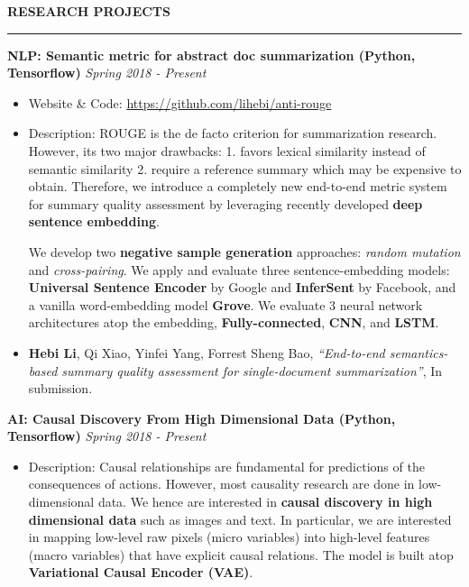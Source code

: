 \documentclass[10pt,letterpaper]{article}
\newenvironment{mysection}[1]{ %
  \medskip
  \MakeUppercase{\bf #1}
  \medskip
  \hrule
  \medskip
  \begin{list}{}{
      \setlength{\leftmargin}{1.5em}
    }
  \item[]
}{
  \end{list}
}
\begin{document}
\begin{mysection}{Research Projects}

  \textbf{NLP: Semantic metric for abstract doc summarization (Python,
    Tensorflow)} \hfill \emph{Spring 2018 - Present}
  \begin{itemize}
  \item Website \& Code: \url{https://github.com/lihebi/anti-rouge}
  \item Description: ROUGE is the de facto criterion for summarization
    research.  However, its two major drawbacks: 1. favors lexical
    similarity instead of semantic similarity 2. require a reference
    summary which may be expensive to obtain.  Therefore, we introduce
    a completely new end-to-end metric system for summary quality
    assessment by leveraging recently developed \textbf{deep sentence
      embedding}.

    We develop two \textbf{negative sample generation} approaches:
    \textit{random mutation} and \textit{cross-pairing}.  We apply and
    evaluate three sentence-embedding models: \textbf{Universal
      Sentence Encoder} by Google and \textbf{InferSent} by Facebook,
    and a vanilla word-embedding model \textbf{Grove}. We evaluate 3
    neural network architectures atop the embedding,
    \textbf{Fully-connected}, \textbf{CNN}, and \textbf{LSTM}.

  \item \textbf{Hebi Li}, Qi Xiao, Yinfei Yang, Forrest Sheng Bao,
    \textit{``End-to-end semantics-based summary quality assessment
      for single-document summarization''}, In submission.
  \end{itemize}
  
  \textbf{AI: Causal Discovery From High Dimensional Data (Python,
    Tensorflow)} \hfill \emph{Spring 2018 - Present}

  \begin{itemize}
  \item Description: Causal relationships are fundamental for
    predictions of the consequences of actions. However, most
    causality research are done in low-dimensional data. We hence are
    interested in \textbf{causal discovery in high dimensional data}
    such as images and text. In particular, we are interested in
    mapping low-level raw pixels (micro variables) into high-level
    features (macro variables) that have explicit causal relations.
    The model is built atop \textbf{Variational Causal Encoder (VAE)}.
  \end{itemize}
  

\end{mysection}
\end{document}
